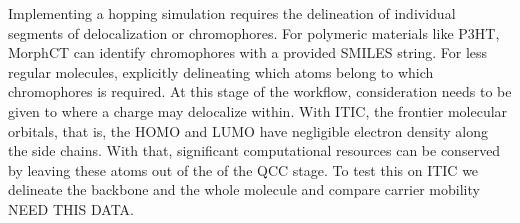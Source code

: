  Implementing a hopping simulation requires the delineation of
individual segments of delocalization or chromophores. For polymeric materials like P3HT, MorphCT
can identify chromophores with a provided SMILES string. For less regular molecules, explicitly delineating
which atoms belong to which chromophores is required. At this stage of the workflow, consideration needs to be
given to where a charge may delocalize within. With ITIC, the frontier molecular orbitals, that is, the HOMO
and LUMO have negligible electron density along the side chains. With that, significant computational resources
can be conserved by leaving these atoms out of the of the QCC stage. To test this on ITIC we delineate the
backbone and the whole molecule and compare carrier mobility NEED THIS DATA. 



